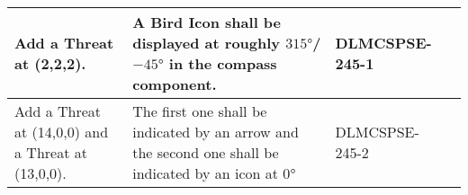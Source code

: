 \begin{xltabular}{\textwidth}{|X|X|M{2cm}|M{2cm}|}
  Add a Threat at (2,2,2). & A Bird Icon shall be displayed at roughly $315°$/$-45°$ in the compass component. & {\color{purpleT}\ttfamily DLMCSPSE-245-1} &  \\ \hline 
  Add a Threat at {\ttfamily (14,0,0)} and a Threat at {\ttfamily (13,0,0)}. & The first one shall be indicated by an arrow and the second one shall be indicated by an icon at $0°$ & {\color{purpleT}\ttfamily DLMCSPSE-245-2} &  \\ \hline 
  
\end{xltabular} 
 \egroup 
 \color{default}